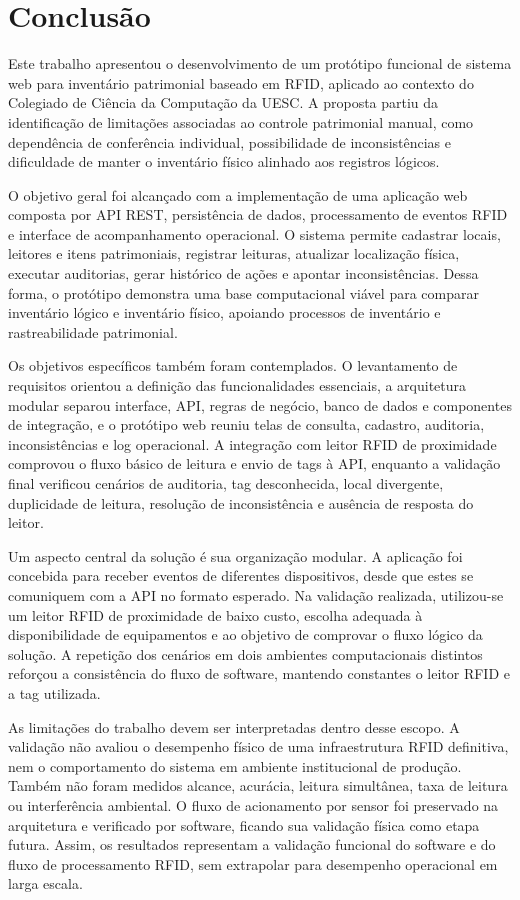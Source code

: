 \chapter{Conclusão}

Este trabalho apresentou o desenvolvimento de um protótipo funcional de sistema web para inventário patrimonial baseado em RFID, aplicado ao contexto do Colegiado de Ciência da Computação da UESC. A proposta partiu da identificação de limitações associadas ao controle patrimonial manual, como dependência de conferência individual, possibilidade de inconsistências e dificuldade de manter o inventário físico alinhado aos registros lógicos.

O objetivo geral foi alcançado com a implementação de uma aplicação web composta por API REST, persistência de dados, processamento de eventos RFID e interface de acompanhamento operacional. O sistema permite cadastrar locais, leitores e itens patrimoniais, registrar leituras, atualizar localização física, executar auditorias, gerar histórico de ações e apontar inconsistências. Dessa forma, o protótipo demonstra uma base computacional viável para comparar inventário lógico e inventário físico, apoiando processos de inventário e rastreabilidade patrimonial.

Os objetivos específicos também foram contemplados. O levantamento de requisitos orientou a definição das funcionalidades essenciais, a arquitetura modular separou interface, API, regras de negócio, banco de dados e componentes de integração, e o protótipo web reuniu telas de consulta, cadastro, auditoria, inconsistências e log operacional. A integração com leitor RFID de proximidade comprovou o fluxo básico de leitura e envio de tags à API, enquanto a validação final verificou cenários de auditoria, tag desconhecida, local divergente, duplicidade de leitura, resolução de inconsistência e ausência de resposta do leitor.

Um aspecto central da solução é sua organização modular. A aplicação foi concebida para receber eventos de diferentes dispositivos, desde que estes se comuniquem com a API no formato esperado. Na validação realizada, utilizou-se um leitor RFID de proximidade de baixo custo, escolha adequada à disponibilidade de equipamentos e ao objetivo de comprovar o fluxo lógico da solução. A repetição dos cenários em dois ambientes computacionais distintos reforçou a consistência do fluxo de software, mantendo constantes o leitor RFID e a tag utilizada.

As limitações do trabalho devem ser interpretadas dentro desse escopo. A validação não avaliou o desempenho físico de uma infraestrutura RFID definitiva, nem o comportamento do sistema em ambiente institucional de produção. Também não foram medidos alcance, acurácia, leitura simultânea, taxa de leitura ou interferência ambiental. O fluxo de acionamento por sensor foi preservado na arquitetura e verificado por software, ficando sua validação física como etapa futura. Assim, os resultados representam a validação funcional do software e do fluxo de processamento RFID, sem extrapolar para desempenho operacional em larga escala.

